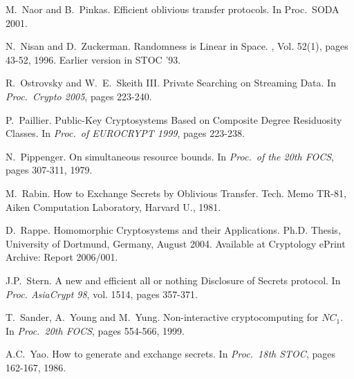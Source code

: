 \documentclass[11pt]{article}
\begin{document}
\begin{thebibliography}{10}
 M.~Naor and B.~Pinkas.
\newblock Efficient oblivious transfer protocols.
\newblock In {Proc.\ SODA 2001}.

 N.~Nisan and D.~Zuckerman.
\newblock Randomness is Linear in Space.
, Vol. 52(1), pages 43-52, 1996.
\newblock Earlier version in STOC '93.


R.~Ostrovsky and W.~E.~Skeith III.
\newblock  Private Searching on
Streaming Data.
\newblock In {\em Proc.\ Crypto 2005}, pages 223-240.

P.~Paillier.
\newblock  Public-Key Cryptosystems Based on Composite Degree Residuosity
Classes.
\newblock  In {\em Proc.\ of EUROCRYPT 1999}, pages 223-238.

\newblock N.~Pippenger.
\newblock On simultaneous resource bounds.
\newblock In {\em Proc.\ of the 20th FOCS}, pages 307-311, 1979.

M.~Rabin.
\newblock How to Exchange Secrets by Oblivious Transfer.
\newblock Tech. Memo TR-81, Aiken Computation Laboratory, Harvard U., 1981.


\newblock D.~Rappe.
\newblock Homomorphic Cryptosystems and their Applications.
\newblock Ph.D. Thesis, University of Dortmund, Germany, August 2004.
Available at Cryptology ePrint Archive: Report 2006/001.

J.P.~Stern.
\newblock A new and efficient all or nothing Disclosure of Secrets protocol.
\newblock In {\em Proc. AsiaCrypt 98}, vol. 1514, pages 357-371.

T.~Sander, A.~Young and M.~Yung.
\newblock Non-interactive cryptocomputing for $NC_1$.
\newblock In {\em Proc.\ 20th FOCS}, pages 554-566, 1999.

A.C.~Yao.
\newblock How to generate and exchange secrets.
\newblock In {\em Proc.\ 18th STOC}, pages 162-167, 1986.

\end{thebibliography}
\end{document}
